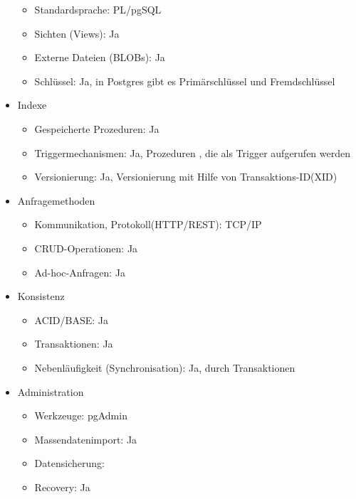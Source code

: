 \begin{itemize}
        \begin{itemize}
            \item Standardsprache: PL/pgSQL %
            \item Sichten (Views): Ja
            \item Externe Dateien (BLOBs): Ja
            \item Schlüssel: Ja, in Postgres gibt es Primärschlüssel und Fremdschlüssel
        \end{itemize}
        \item Indexe
        \begin{itemize}
            \item Gespeicherte Prozeduren: Ja
            \item Triggermechanismen: Ja, Prozeduren , die als Trigger aufgerufen werden %
            \item Versionierung: Ja, Versionierung mit Hilfe von Transaktions-ID(XID) %
        \end{itemize}
        \item Anfragemethoden
        \begin{itemize}
            \item Kommunikation, Protokoll(HTTP/REST): TCP/IP
            \item CRUD-Operationen: Ja
            \item Ad-hoc-Anfragen: Ja
        \end{itemize}
        \item Konsistenz
        \begin{itemize}
            \item ACID/BASE: Ja
            \item Transaktionen: Ja
            \item Nebenläufigkeit (Synchronisation): Ja, durch Transaktionen
        \end{itemize}
        \item Administration
        \begin{itemize}
            \item Werkzeuge: pgAdmin
            \item Massendatenimport: Ja
            \item Datensicherung:
            \item Recovery: Ja
        \end{itemize}
    \end{itemize}
